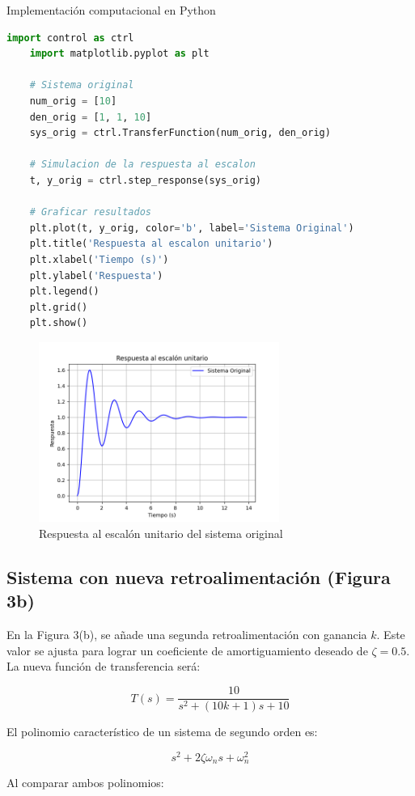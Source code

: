 \documentclass[10pt]{article}
\theoremstyle{definition}
\theoremstyle{remark}
\theoremstyle{definition}
\numberwithin{equation}{prob}
\begin{document}
Implementación computacional en Python
\begin{lstlisting}[language=Python]
	import control as ctrl
	import matplotlib.pyplot as plt
	
	# Sistema original
	num_orig = [10]
	den_orig = [1, 1, 10]
	sys_orig = ctrl.TransferFunction(num_orig, den_orig)

	# Simulacion de la respuesta al escalon
	t, y_orig = ctrl.step_response(sys_orig)

	# Graficar resultados
	plt.plot(t, y_orig, color='b', label='Sistema Original')
	plt.title('Respuesta al escalon unitario')
	plt.xlabel('Tiempo (s)')
	plt.ylabel('Respuesta')
	plt.legend()
	plt.grid()
	plt.show()
\end{lstlisting}

\begin{figure}[h]
	\centering
	\includegraphics[width=0.7\textwidth]{./figures/Figura 4 ejercicio 5.png}
	\caption{Respuesta al escalón unitario del sistema original}
\end{figure}

\subsection{Sistema con nueva retroalimentación (Figura 3b)}

En la Figura 3(b), se añade una segunda retroalimentación con ganancia \(k\). Este valor se ajusta para lograr un coeficiente de amortiguamiento deseado de \( \zeta = 0.5 \). La nueva función de transferencia será:

\[
	T(s) = \frac{10}{s^2 + (10k + 1)s + 10}
\]

El polinomio característico de un sistema de segundo orden es:

\[
	s^2 + 2\zeta \omega_n s + \omega_n^2
\]

Al comparar ambos polinomios:
\end{document}
